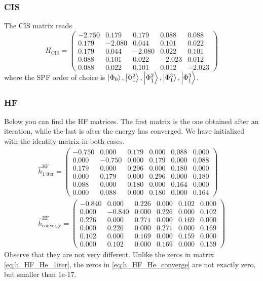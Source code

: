 \subsubsection{CIS}
The CIS matrix reads
\begin{equation}
\hat{H}_{\text{CIS}}=
\begin{pmatrix}
-2.750 & 0.179 & 0.179 & 0.088 & 0.088\\
0.179 & -2.080 & 0.044 & 0.101 & 0.022\\
0.179 & 0.044 & -2.080 & 0.022 & 0.101\\
0.088 & 0.101 & 0.022 & -2.023 & 0.012\\
0.088 & 0.022 & 0.101 & 0.012 & -2.023
\end{pmatrix}
\label{eq:H_He}
\end{equation}
where the SPF order of choice is $\ket{\Phi_0}, \ket{\Phi_1^2}, \ket{\Phi_{\bar{1}}^{\bar{2}}}, \ket{\Phi_1^3}, \ket{\Phi_{\bar{1}}^{\bar{3}}}$.

\subsubsection{HF}
Below you can find the HF matrices. The first matrix is the one obtained after an iteration, while the last is after the energy has converged. We have initialized with the identity matrix in both cases. 
\begin{align}
\hat{h}_{\text{1 iter}}^{\text{HF}}=
\begin{pmatrix}
-0.750 & 0.000 & 0.179 & 0.000 & 0.088 & 0.000\\
0.000 & -0.750 & 0.000 & 0.179 & 0.000 & 0.088\\
0.179 & 0.000 & 0.296 & 0.000 & 0.180 & 0.000\\
0.000 & 0.179 & 0.000 & 0.296 & 0.000 & 0.180\\
0.088 & 0.000 & 0.180 & 0.000 & 0.164 & 0.000\\
0.000 & 0.088 & 0.000 & 0.180 & 0.000 & 0.164
\end{pmatrix}\label{eq:h_HF_He_1iter}\\
\hat{h}_{\text{converge}}^{\text{HF}}=
\begin{pmatrix}
-0.840 & 0.000 & 0.226 & 0.000 & 0.102 & 0.000\\
0.000 & -0.840 & 0.000 & 0.226 & 0.000 & 0.102\\
0.226 & 0.000 & 0.271 & 0.000 & 0.169 & 0.000\\
0.000 & 0.226 & 0.000 & 0.271 & 0.000 & 0.169\\
0.102 & 0.000 & 0.169 & 0.000 & 0.159 & 0.000\\
0.000 & 0.102 & 0.000 & 0.169 & 0.000 & 0.159
\end{pmatrix}
\label{eq:h_HF_He_converge}
\end{align}
Observe that they are not very different. Unlike the zeros in matrix \eqref{eq:h_HF_He_1iter}, the zeros in \eqref{eq:h_HF_He_converge} are not exactly zero, but smaller than 1e-17. 

